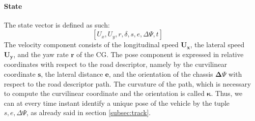\documentclass[a4paper, onecolumn, 11pt]{article}
\begin{document}
\paragraph*{State} The state vector is defined as such: \[[U_x,U_y,r,\delta,s,e,\Delta\varPsi,t]\]
The velocity component consists of the longitudinal speed $\mathbf{U_x}$, the lateral speed $\mathbf{U_y}$, and the yaw
rate $\mathbf{r}$ of the CG. The pose component is expressed in
relative coordinates with respect to the road descriptor, namely by the
curvilinear coordinate $\mathbf{s}$, the lateral distance $\mathbf{e}$, and the
orientation of the chassis $\mathbf{\Delta \varPsi}$ with respect to the road
descriptor path. The curvature of the path, which is necessary to compute the
curvilinear coordinate and the orientation is called $\mathbf{\kappa}$. Thus, we
can at every time instant identify a unique pose of the vehicle by the tuple
$s,e,\Delta \varPsi$, as already said in section \ref*{subsec:track}.
\end{document}
